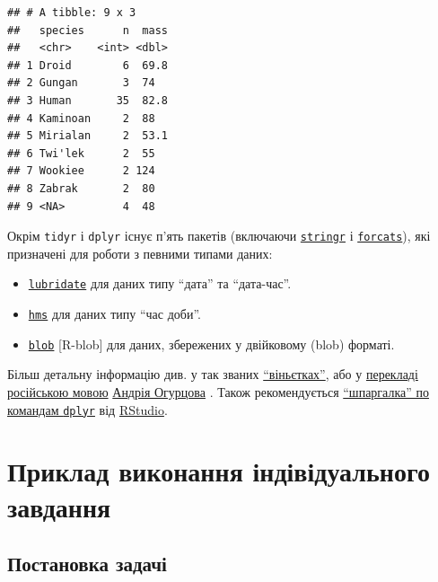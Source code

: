 \documentclass[
]{book}
\providecommand{\tightlist}{%
  \setlength{\itemsep}{0pt}\setlength{\parskip}{0pt}}
\begin{document}
\begin{verbatim}
## # A tibble: 9 x 3
##   species      n  mass
##   <chr>    <int> <dbl>
## 1 Droid        6  69.8
## 2 Gungan       3  74  
## 3 Human       35  82.8
## 4 Kaminoan     2  88  
## 5 Mirialan     2  53.1
## 6 Twi'lek      2  55  
## 7 Wookiee      2 124  
## 8 Zabrak       2  80  
## 9 <NA>         4  48
\end{verbatim}

Окрім \texttt{tidyr} і \texttt{dplyr} існує п'ять пакетів (включаючи \href{https://stringr.tidyverse.org/}{\texttt{stringr}} і \href{http://forcats.tidyverse.org/}{\texttt{forcats}}), які призначені для роботи з певними типами даних:

\begin{itemize}
\tightlist
\item
  \href{http://lubridate.tidyverse.org/}{\texttt{lubridate}} \citep{R-lubridate} для даних типу ``дата'' та ``дата-час''.
\item
  \href{https://github.com/tidyverse/hms}{\texttt{hms}} \citep{R-hms} для даних типу ``час доби''.
\item
  \href{https://github.com/tidyverse/blob}{\texttt{blob}} {[}R-blob{]} для даних, збережених у двійковому (blob) форматі.
\end{itemize}

Більш детальну інформацію див. у так званих \href{https://cran.r-project.org/web/packages/dplyr/}{``віньєтках''}, або у \href{http://biostat-r.blogspot.com/search/label/data_frame}{перекладі російською мовою} \href{http://biostat-r.blogspot.com/search/label/data_frame}{Андрія Огурцова} \citep{Rusdplyr}. Також рекомендується \href{doc/data-trasformation.pdf}{``шпаргалка'' по командам \texttt{dplyr}} від \href{https://www.rstudio.com/resources/cheatsheets/}{RStudio}.

\hypertarget{ux43fux440ux438ux43aux43bux430ux434-ux432ux438ux43aux43eux43dux430ux43dux43dux44f-ux456ux43dux434ux456ux432ux456ux434ux443ux430ux43bux44cux43dux43eux433ux43e-ux437ux430ux432ux434ux430ux43dux43dux44f}{%
\section{Приклад виконання індівідуального завдання}\label{ux43fux440ux438ux43aux43bux430ux434-ux432ux438ux43aux43eux43dux430ux43dux43dux44f-ux456ux43dux434ux456ux432ux456ux434ux443ux430ux43bux44cux43dux43eux433ux43e-ux437ux430ux432ux434ux430ux43dux43dux44f}}

\hypertarget{ux43fux43eux441ux442ux430ux43dux43eux432ux43aux430-ux437ux430ux434ux430ux447ux456-1}{%
\subsection{Постановка задачі}\label{ux43fux43eux441ux442ux430ux43dux43eux432ux43aux430-ux437ux430ux434ux430ux447ux456-1}}
\end{document}
